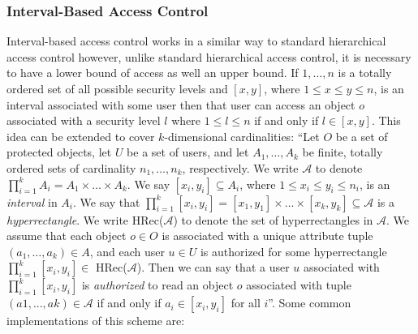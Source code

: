 \documentclass[12pt, titlepage]{article}
\begin{document}
\subsubsection{Interval-Based Access Control}
Interval-based access control works in a similar way to standard hierarchical access control however, unlike standard hierarchical access control, it is necessary to have a lower bound of access as well an upper bound. If $1, \dots , n$ is a totally ordered set of all possible security levels and $[x,y]$, where $1≤x≤y≤n$, is an interval associated with some user then that user can access an object $o$ associated with a security level $l$ where $1≤l≤n$ if and only if $l ∈ [x,y]$.
\newline \indent This idea can be extended to cover $k$-dimensional cardinalities:
\newline \indent ``Let $O$ be a set of protected objects, let $U$ be a set of users, and let $A_{1}, \dots , A_{k}$ be finite, totally ordered sets of cardinality $n_{1} , \dots , n_{k}$, respectively. We write $\mathcal{A}$ to denote $\prod_{i=1}^k A_{i} = A_{1} \times \dots \times A_{k}$.  
\newline \indent We say $[x_{i},y_{i}] ⊆ A_{i}$, where $1≤x_{i}≤y_{i}≤n_{i}$, is an \textit{interval} in $A_{i}$. We say that $\prod_{i=1}^k [x_{i},y_{i}] = [x_{1},y_{1}] \times \dots \times [x_{k},y_{k}] ⊆ \mathcal{A}$ is a \textit{hyperrectangle}. We write HRec($\mathcal{A}$) to denote the set of hyperrectangles in $\mathcal{A}$.
\newline \indent We assume that each object $o ∈ O$ is associated with a unique attribute tuple $(a_{1} , \dots , a_{k}) ∈ A$, and each user $u ∈ U$ is authorized for some hyperrectangle $\prod_{i=1}^k [x_{i},y_{i}] ∈$ HRec($\mathcal{A}$). Then we can say that a user $u$ associated with $\prod_{i=1}^k [x_{i},y_{i}]$ is \textit{authorized} to read an object $o$ associated with tuple $(a1 , . . . , ak) ∈ \mathcal{A}$ if and only if $a_{i} ∈ [x_{i},y_{i}]$ for all $i$''\cite{mainPaper}.
\newline \indent Some common implementations of this scheme are:\cite{mainPaper}
\end{document}

